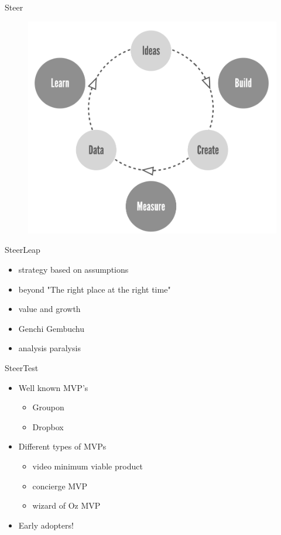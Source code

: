 \documentclass[aspectratio=169]{beamer}
\begin{document}

\begin{frame}{Steer}
  \begin{figure}
    \includegraphics[scale=0.24]{build-measure-learn}
  \end{figure}
\end{frame}


\begin{frame}{Steer}{Leap}
  \begin{itemize}
    \item strategy based on assumptions
    \item beyond "The right place at the right time"
    \item value and growth
    \item Genchi Gembuchu
    \item analysis paralysis
  \end{itemize}
\end{frame}

\begin{frame}{Steer}{Test}
  \begin{itemize}
    \item Well known MVP's
      \begin{itemize}
        \item Groupon
        \item Dropbox
      \end{itemize}
    \item Different types of MVPs
      \begin{itemize}

        \item video minimum viable product
        \item concierge MVP
        \item wizard of Oz MVP
      \end{itemize}
    \item Early adopters!
  \end{itemize}
\end{frame}
\end{document}

